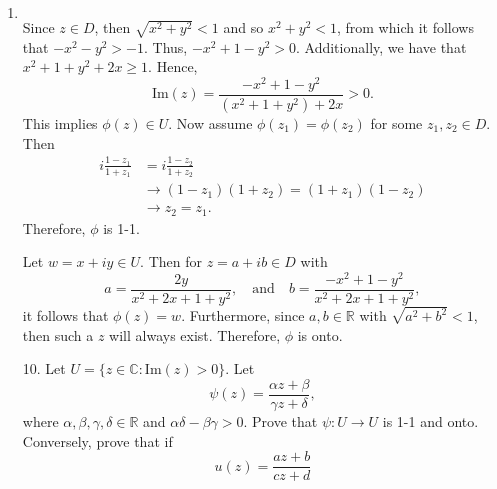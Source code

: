 \documentclass[12pt]{article}
\makeatletter
\theoremstyle{definition}
\theoremstyle{remark}
\renewenvironment{proof}[1][\proofname]{\par
  \pushQED{\qed}%
  \normalfont \topsep6\p@\@plus6\p@\relax
  \list{}{\leftmargin=0mm
          \rightmargin=4mm
          \settowidth{\itemindent}{\itshape#1}%
          \labelwidth=\itemindent
          \parsep=0pt \listparindent=\parindent 
  }
  \item[\hskip\labelsep
        \itshape
    #1\@addpunct{.}]\ignorespaces
}{%
  \popQED\endlist\@endpefalse
}
\let\oldproofname=\proofname
\renewcommand{\proofname}{\bf{\textit{\oldproofname}}}
\makeatother
\begin{document}
\begin{enumerate}[leftmargin=*]
\begin{proof}
\begin{equation*}
                        \end{equation*}
                    Since $z\in D$, then $\sqrt{x^2+y^2}<1$ and so $x^2+y^2<1$, from which it follows that $-x^2-y^2>-1$. Thus, $-x^2+1-y^2>0$. Additionally, we have that $x^2+1+y^2+2x\geq1$. Hence, 
                        \begin{equation*}
                            \text{Im}(z)=\frac{-x^2+1-y^2}{(x^2+1+y^2)+2x}>0.
                        \end{equation*}
                    This implies $\phi(z)\in U$. Now assume $\phi(z_1)=\phi(z_2)$ for some $z_1,z_2\in D$. Then
                        \begin{equation*}
                            \begin{split}
                                i\frac{1-z_1}{1+z_1}&=i\frac{1-z_2}{1+z_2} \\
                                &\rightarrow (1-z_1)(1+z_2)=(1+z_1)(1-z_2) \\
                                &\rightarrow z_2=z_1.
                            \end{split}
                        \end{equation*}
                    Therefore, $\phi$ is 1-1.\par\hspace{4mm} Let $w=x+iy\in U$. Then for $z=a+ib\in D$ with 
                        \begin{equation*}
                            a=\frac{2y}{x^2+2x+1+y^2},\quad\text{and}\quad b=\frac{-x^2+1-y^2}{x^2+2x+1+y^2},
                        \end{equation*}
                    it follows that $\phi(z)=w$. Furthermore, since $a, b\in\mathbb{R}$ with $\sqrt{a^2+b^2}<1$, then such a $z$ will always exist. Therefore, $\phi$ is onto.
                \end{proof}
        \item[10.] Let $U=\{z\in\mathbb{C}\colon\text{Im}(z)>0\}$. Let 
            \begin{equation*}
                \psi(z)=\frac{\alpha z+\beta}{\gamma z+\delta},
            \end{equation*}
        where $\alpha,\beta,\gamma,\delta\in\mathbb{R}$ and $\alpha\delta-\beta\gamma>0$. Prove that $\psi\colon U\rightarrow U$ is 1-1 and onto. Conversely, prove that if 
            \begin{equation*}
                u(z)=\frac{az+b}{cz+d}
            \end{equation*}

\end{enumerate}
\end{document}

